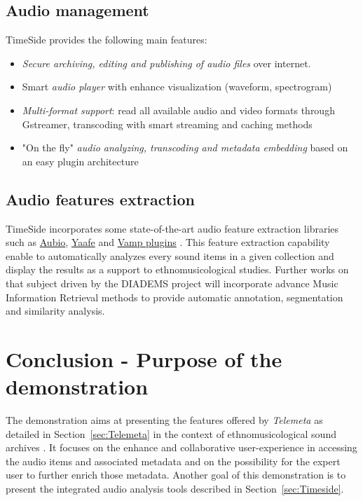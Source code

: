 \documentclass[runningheads,a4paper]{llncs}
\begin{document}
\vspace{-0.4cm}
\subsection{Audio management}
TimeSide provides the following main features:
\begin{itemize}
\item \emph{Secure archiving, editing and publishing of audio files} over
  internet.
\item Smart \emph{audio player} with enhance visualization (waveform, spectrogram)
\item \emph{Multi-format support}: read all available audio and video formats  through Gstreamer, transcoding with smart streaming and caching methods%
\item "On the fly" \emph{audio analyzing, transcoding and metadata
    embedding} based on an easy plugin architecture
\end{itemize}
\vspace{-0.4cm}
\subsection{Audio features extraction}
TimeSide incorporates some state-of-the-art audio feature extraction libraries such as \href{http://aubio.org}{Aubio}, \href{http://yaafe.sourceforge.net}{Yaafe} and \href{http://www.vamp-plugins.org}{Vamp plugins} \cite{brossierPhD,yaafe_ISMIR2010,vamp-plugins}.
This feature extraction capability enable to automatically analyzes every sound items in a given collection and display the results as a support to ethnomusicological studies.
Further works on that subject driven by the DIADEMS project will incorporate advance Music Information Retrieval methods to provide automatic annotation, segmentation and similarity analysis.
\vspace{-0.2cm}
\section{Conclusion - Purpose of the demonstration}\vspace{-0.2cm}
The demonstration aims at presenting the features offered by \emph{Telemeta} as detailed in Section~\ref{sec:Telemeta} in the context of ethnomusicological sound archives \cite{telemetaCREM}. It focuses on the enhance and collaborative user-experience in accessing the audio items and associated metadata and on the possibility for the expert user to further enrich those metadata.
Another goal of this demonstration is to present the integrated audio analysis tools described in Section~\ref{sec:Timeside}.
\end{document}
